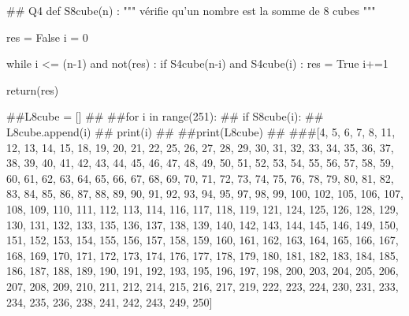 \documentclass[10pt,fleqn]{article} %
\begin{document}
\begin{corrige}
\begin{python}
## Q4
def S8cube(n) :
    """ vérifie qu'un nombre est la somme de 8 cubes """
    
    res = False
    i = 0
    
    while i <= (n-1) and not(res) :
        if S4cube(n-i) and S4cube(i) :
            res = True
        i+=1
        
    return(res)


##L8cube = []
##
##for i in range(251):
##    if S8cube(i):
##        L8cube.append(i)
##    print(i)
##
##print(L8cube)
##
###[4, 5, 6, 7, 8, 11, 12, 13, 14, 15, 18, 19, 20, 21, 22, 25, 26, 27, 28, 29, 30, 31, 32, 33, 34, 35, 36, 37, 38, 39, 40, 41, 42, 43, 44, 45, 46, 47, 48, 49, 50, 51, 52, 53, 54, 55, 56, 57, 58, 59, 60, 61, 62, 63, 64, 65, 66, 67, 68, 69, 70, 71, 72, 73, 74, 75, 76, 78, 79, 80, 81, 82, 83, 84, 85, 86, 87, 88, 89, 90, 91, 92, 93, 94, 95, 97, 98, 99, 100, 102, 105, 106, 107, 108, 109, 110, 111, 112, 113, 114, 116, 117, 118, 119, 121, 124, 125, 126, 128, 129, 130, 131, 132, 133, 135, 136, 137, 138, 139, 140, 142, 143, 144, 145, 146, 149, 150, 151, 152, 153, 154, 155, 156, 157, 158, 159, 160, 161, 162, 163, 164, 165, 166, 167, 168, 169, 170, 171, 172, 173, 174, 176, 177, 178, 179, 180, 181, 182, 183, 184, 185, 186, 187, 188, 189, 190, 191, 192, 193, 195, 196, 197, 198, 200, 203, 204, 205, 206, 207, 208, 209, 210, 211, 212, 214, 215, 216, 217, 219, 222, 223, 224, 230, 231, 233, 234, 235, 236, 238, 241, 242, 243, 249, 250]

\end{python}
\end{corrige}
\end{document}
